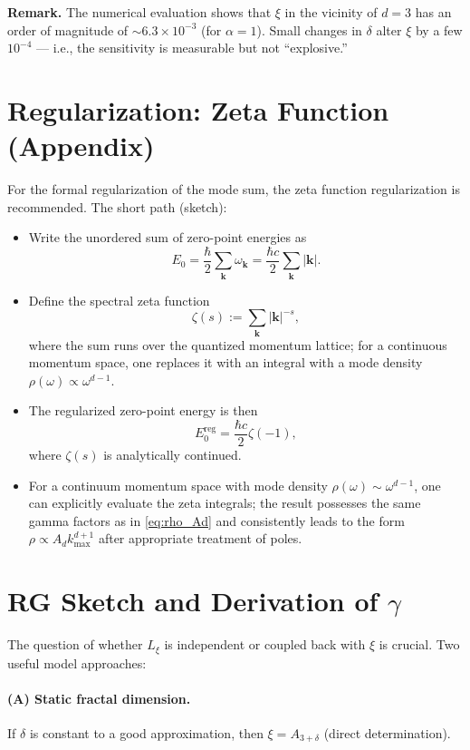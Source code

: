 	\noindent\textbf{Remark.} The numerical evaluation shows that \(\xi\) in the vicinity of \(d=3\) has an order of magnitude of \(\sim 6.3\times10^{-3}\) (for \(\alpha=1\)). Small changes in \(\delta\) alter \(\xi\) by a few \(10^{-4}\) — i.e., the sensitivity is measurable but not ``explosive.''
	
	\section{Regularization: Zeta Function (Appendix)}
	\label{app:zeta}
	
	For the formal regularization of the mode sum, the zeta function regularization is recommended. The short path (sketch):
	
	\begin{itemize}
		\item Write the unordered sum of zero-point energies as
		\[
		E_0 = \frac{\hbar}{2}\sum_{\mathbf{k}}\omega_{\mathbf{k}} = \frac{\hbar c}{2}\sum_{\mathbf{k}}|\mathbf{k}|.
		\]
		\item Define the spectral zeta function
		\[
		\zeta(s) := \sum_{\mathbf{k}} |\mathbf{k}|^{-s},
		\]
		where the sum runs over the quantized momentum lattice; for a continuous momentum space, one replaces it with an integral with a mode density \(\rho(\omega)\propto \omega^{d-1}\).
		\item The regularized zero-point energy is then
		\[
		E_0^{\mathrm{reg}} = \frac{\hbar c}{2}\zeta(-1),
		\]
		where \(\zeta(s)\) is analytically continued.
		\item For a continuum momentum space with mode density \(\rho(\omega) \sim \omega^{d-1}\), one can explicitly evaluate the zeta integrals; the result possesses the same gamma factors as in \eqref{eq:rho_Ad} and consistently leads to the form \(\rho\propto A_d k_{\max}^{d+1}\) after appropriate treatment of poles.
	\end{itemize}
	
	\section{RG Sketch and Derivation of \(\gamma\)}
	\label{sec:rg_gamma}
	
	The question of whether \(L_\xi\) is independent or coupled back with \(\xi\) is crucial. Two useful model approaches:
	
	\paragraph{(A) Static fractal dimension.} If \(\delta\) is constant to a good approximation, then \(\xi=A_{3+\delta}\) (direct determination).
	
